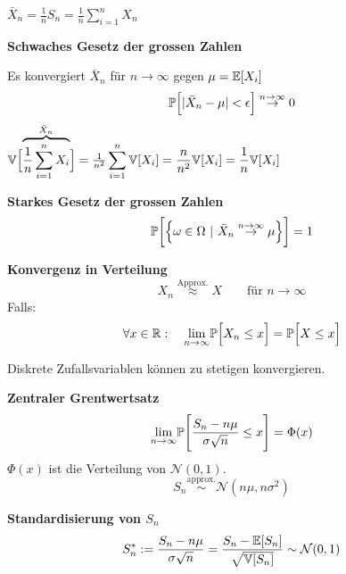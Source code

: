 {\footnotesize
    \notation $\displaystyle\bar{X}_n = \frac{1}{n}S_n = \frac{1}{n}\sum_{i=1}^{n}X_n$
}

\theorem \textbf{Schwaches Gesetz der grossen Zahlen}\\

Es konvergiert $\bar{X}_n$ für $n\to\infty$ gegen $\mu = \E[X_i]$ 
$$
    \P\Bigl[ |\bar{X}_n - \mu| < \epsilon \Bigr] \overset{n\to\infty}{\rightarrow} 0
$$
{\footnotesize
    \remark $\V\Bigl[\overbrace{\frac{1}{n}\sum_{i=1}^nX_i}^{\bar{X}_n}\Bigr] = \frac{1}{n^2}\displaystyle\sum_{i=1}^n\V[X_i] = \frac{n}{n^2}\V[X_i] = \frac{1}{n}\V[X_i]$
}

\theorem \textbf{Starkes Gesetz der grossen Zahlen}\\
$$
    \P\biggl[ \Bigl\{ \omega\in\Omega \sep \bar{X}_n \overset{n\to\infty}{\to}\mu \Bigr\} \biggr] = 1
$$

 \textbf{Konvergenz in Verteilung}\\
$$
    X_n \overset{\text{Approx.}}{\approx} X \qquad \text{für } n \to \infty
$$
Falls:
$$
    \forall x \in \R:\quad \underset{n\to\infty}{\lim}\P\Bigl[ X_n \leq x \Bigr] = \P\Bigl[X \leq x\Bigr]
$$

{\footnotesize
    \remark Diskrete Zufallsvariablen können zu stetigen konvergieren.
}




\theorem \textbf{Zentraler Grentwertsatz}\\
$$
    \underset{n\to\infty}{\lim}\P\Biggl[ \frac{S_n - n\mu}{\sigma\sqrt{n}} \leq x \Biggr] = \Phi(x)
$$
$\Phi(x)$ ist die Verteilung von $\mathcal{N}(0, 1)$.
$$
    S_n \overset{\text{approx.}}{\sim} \mathcal{N}(n\mu, n\sigma^2) 
$$

 \textbf{Standardisierung von $S_n$}
$$
    S_n^* := \frac{S_n - n\mu}{\sigma\sqrt{n}} = \frac{S_n - \E[S_n]}{\sqrt{\V[S_n]}} \sim \mathcal{N}(0,1)
$$


\newpage

